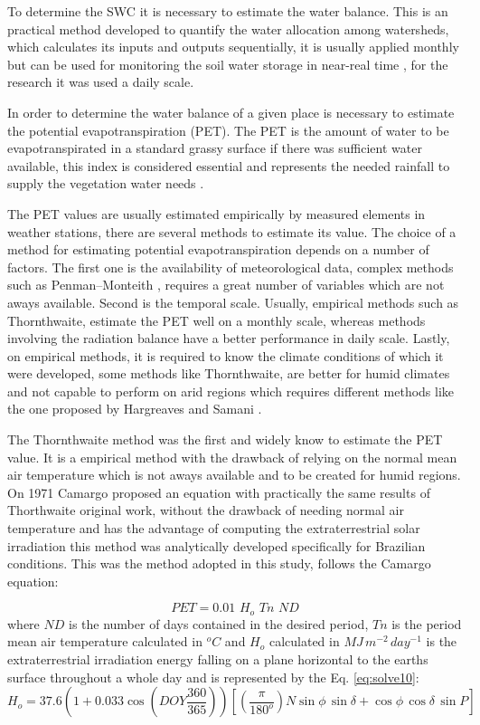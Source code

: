To determine the SWC it is necessary to estimate the water balance. This is an practical method developed to quantify the water allocation among watersheds, which calculates its inputs and outputs sequentially, it is usually applied monthly but can be used for monitoring the soil water storage in near-real time \cite{thornthwaite1957instructions}, for the research it was used a daily scale.

In order to determine the water balance of a given place is necessary to estimate the potential evapotranspiration (PET). The PET is the amount of water to be evapotranspirated in a standard grassy surface if there was sufficient water available, this index is considered essential and represents the needed rainfall to supply the vegetation water needs \cite{de2000revisao}.

The PET values are usually estimated empirically by measured elements in weather stations, there are several methods to estimate its value. The choice of a method for estimating potential evapotranspiration depends on a number of factors. The first one is the availability of meteorological data, complex methods such as Penman–Monteith \cite{allen1998crop}, requires a great number of variables which are not aways available. Second is the temporal scale. Usually, empirical methods such as Thornthwaite, estimate the PET well on a monthly scale, whereas methods involving the radiation balance have a better performance in daily scale. Lastly, on empirical methods, it is required to know the climate conditions of which it were developed, some methods like Thornthwaite, are better for humid climates and not capable to perform on arid regions which requires different methods like the one proposed by Hargreaves and Samani \cite{hargreaves1985reference}.

The Thornthwaite method \cite{thornthwaite1948approach} was the first and widely know to estimate the PET value. It is a empirical method with the drawback of relying on the normal mean air temperature which is not aways available and to be created for humid regions. On 1971 Camargo\cite{camargo1971paulo} proposed an equation with practically the same results of Thorthwaite original work, without the drawback of needing normal air temperature and has the advantage of computing the extraterrestrial solar irradiation this method was analytically developed specifically for Brazilian conditions. This was the method adopted in this study, follows the Camargo equation:

\begin{equation}
\label{eq:solve9}
PET = 0.01 \,\, H_o \,\, Tn \,\, ND
\end{equation}
where $ND$ is the number of days contained in the desired period, $Tn$ is the period mean air temperature calculated in $^oC$ and $H_o$ calculated in ${MJ} \, m^{-2} \, day^{-1} $ is the extraterrestrial
irradiation energy falling on a plane horizontal to the earths surface throughout a whole day and is represented by the Eq. \ref{eq:solve10}:
\begin{equation}
\label{eq:solve10}
H_o = 37.6(1 + 0.033\cos(DOY\frac{360}{365}))[(\frac{\pi}{180^o}){N} \sin\phi \, \sin\delta + \cos\phi \, \cos\delta \, \sin P]
\end{equation}

